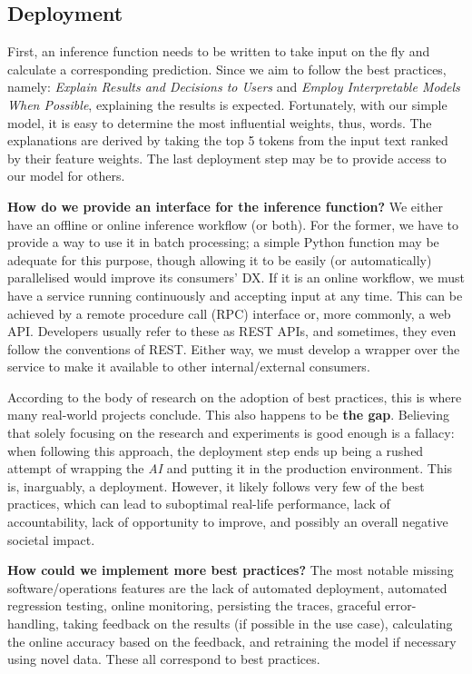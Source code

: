 \subsection{Deployment}

First, an inference function needs to be written to take input on the fly and calculate a corresponding prediction. Since we aim to follow the best practices, namely: \textit{Explain Results and Decisions to Users} and \textit{Employ Interpretable Models When Possible}, explaining the results is expected. Fortunately, with our simple model, it is easy to determine the most influential weights, thus, words. The explanations are derived by taking the top 5 tokens from the input text ranked by their feature weights. The last deployment step may be to provide access to our model for others.

\begin{displayquote}
\textbf{How do we provide an interface for the inference function?} We either have an offline or online inference workflow (or both). For the former, we have to provide a way to use it in batch processing; a simple Python function may be adequate for this purpose, though allowing it to be easily (or automatically) parallelised would improve its consumers' DX. If it is an online workflow, we must have a service running continuously and accepting input at any time. This can be achieved by a remote procedure call (RPC) interface or, more commonly, a web API. Developers usually refer to these as REST APIs, and sometimes, they even follow the conventions of REST. Either way, we must develop a wrapper over the service to make it available to other internal/external consumers.
\end{displayquote}

According to the body of research on the adoption of best practices, this is where many real-world projects conclude. This also happens to be \textbf{the gap}. Believing that solely focusing on the research and experiments is good enough is a fallacy: when following this approach, the deployment step ends up being a rushed attempt of wrapping the \textit{AI} and putting it in the production environment. This is, inarguably, a deployment. However, it likely follows very few of the best practices, which can lead to suboptimal real-life performance, lack of accountability, lack of opportunity to improve, and possibly an overall negative societal impact.

\begin{displayquote}
\textbf{How could we implement more best practices?} The most notable missing software/operations features are the lack of automated deployment, automated regression testing, online monitoring, persisting the traces, graceful error-handling, taking feedback on the results (if possible in the use case), calculating the online accuracy based on the feedback, and retraining the model if necessary using novel data. These all correspond to best practices.
\end{displayquote}

